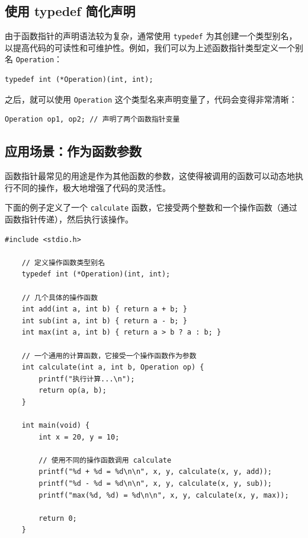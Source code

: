 \subsection{使用 typedef 简化声明}

由于函数指针的声明语法较为复杂，通常使用 \texttt{typedef} 为其创建一个类型别名，以提高代码的可读性和可维护性。例如，我们可以为上述函数指针类型定义一个别名 \texttt{Operation}：

\begin{lstlisting}[style=c]
	typedef int (*Operation)(int, int);
\end{lstlisting}

之后，就可以使用 \texttt{Operation} 这个类型名来声明变量了，代码会变得非常清晰：

\begin{lstlisting}[style=c]
	Operation op1, op2; // 声明了两个函数指针变量
\end{lstlisting}

\subsection{应用场景：作为函数参数}

函数指针最常见的用途是作为其他函数的参数，这使得被调用的函数可以动态地执行不同的操作，极大地增强了代码的灵活性。

下面的例子定义了一个 \texttt{calculate} 函数，它接受两个整数和一个操作函数（通过函数指针传递），然后执行该操作。

\begin{lstlisting}[style=c]
	#include <stdio.h>
	
	// 定义操作函数类型别名
	typedef int (*Operation)(int, int);
	
	// 几个具体的操作函数
	int add(int a, int b) { return a + b; }
	int sub(int a, int b) { return a - b; }
	int max(int a, int b) { return a > b ? a : b; }
	
	// 一个通用的计算函数，它接受一个操作函数作为参数
	int calculate(int a, int b, Operation op) {
		printf("执行计算...\n");
		return op(a, b);
	}
	
	int main(void) {
		int x = 20, y = 10;
		
		// 使用不同的操作函数调用 calculate
		printf("%d + %d = %d\n\n", x, y, calculate(x, y, add));
		printf("%d - %d = %d\n\n", x, y, calculate(x, y, sub));
		printf("max(%d, %d) = %d\n\n", x, y, calculate(x, y, max));
		
		return 0;
	}
\end{lstlisting}

